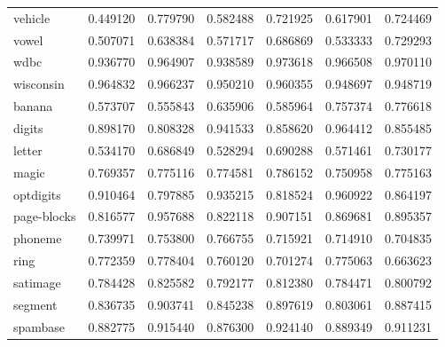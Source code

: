 \begin{tabular}{lrrrrrr}
vehicle         &         0.449120 &  0.779790 &                  0.582488 &       0.721925 &                  0.617901 &       0.724469 \\
vowel           &         0.507071 &  0.638384 &                  0.571717 &       0.686869 &                  0.533333 &       0.729293 \\
wdbc            &         0.936770 &  0.964907 &                  0.938589 &       0.973618 &                  0.966508 &       0.970110 \\
wisconsin       &         0.964832 &  0.966237 &                  0.950210 &       0.960355 &                  0.948697 &       0.948719 \\
banana          &         0.573707 &  0.555843 &                  0.635906 &       0.585964 &                  0.757374 &       0.776618 \\
digits          &         0.898170 &  0.808328 &                  0.941533 &       0.858620 &                  0.964412 &       0.855485 \\
letter          &         0.534170 &  0.686849 &                  0.528294 &       0.690288 &                  0.571461 &       0.730177 \\
magic           &         0.769357 &  0.775116 &                  0.774581 &       0.786152 &                  0.750958 &       0.775163 \\
optdigits       &         0.910464 &  0.797885 &                  0.935215 &       0.818524 &                  0.960922 &       0.864197 \\
page-blocks     &         0.816577 &  0.957688 &                  0.822118 &       0.907151 &                  0.869681 &       0.895357 \\
phoneme         &         0.739971 &  0.753800 &                  0.766755 &       0.715921 &                  0.714910 &       0.704835 \\
ring            &         0.772359 &  0.778404 &                  0.760120 &       0.701274 &                  0.775063 &       0.663623 \\
satimage        &         0.784428 &  0.825582 &                  0.792177 &       0.812380 &                  0.784471 &       0.800792 \\
segment         &         0.836735 &  0.903741 &                  0.845238 &       0.897619 &                  0.803061 &       0.887415 \\
spambase        &         0.882775 &  0.915440 &                  0.876300 &       0.924140 &                  0.889349 &       0.911231 \\

\end{tabular}
